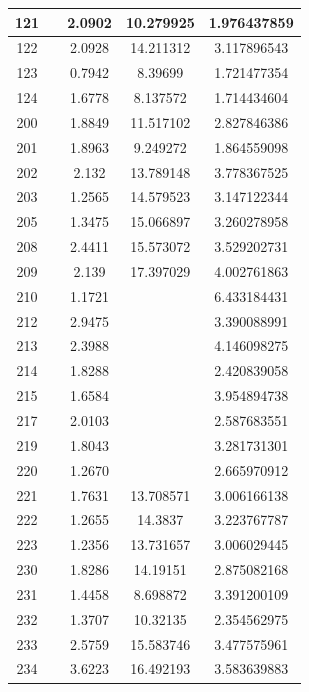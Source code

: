 \begin{table}[!tp]
\begin{tabular}{|c|c|c|c|c|}
		121 & & 2.0902 & 10.279925 & 1.976437859\\ \hline
		122 & & 2.0928 & 14.211312 & 3.117896543\\ \hline
		123 & & 0.7942 &  8.39699  & 1.721477354\\ \hline
		124 & & 1.6778 &  8.137572 & 1.714434604\\ \hline
		200 & & 1.8849 & 11.517102 & 2.827846386\\ \hline
		201 & & 1.8963 &  9.249272 & 1.864559098\\ \hline
		202 & & 2.132  & 13.789148 & 3.778367525\\ \hline
		203 & & 1.2565 & 14.579523 & 3.147122344\\ \hline
		205 & & 1.3475 & 15.066897 & 3.260278958\\ \hline
		208 & & 2.4411 & 15.573072 & 3.529202731\\ \hline
		209 & & 2.139  & 17.397029 & 4.002761863\\ \hline	
		210 & & 1.1721 &  & 6.433184431\\ \hline
		212 & & 2.9475 &  & 3.390088991\\ \hline
		213 & & 2.3988 &  & 4.146098275\\ \hline
		214 & & 1.8288 &  & 2.420839058\\ \hline
		215 & & 1.6584 &  & 3.954894738\\ \hline
		217 & & 2.0103 &  & 2.587683551\\ \hline
		219 & & 1.8043 &  & 3.281731301\\ \hline
		220 & & 1.2670 &  & 2.665970912\\ \hline		
		221 & & 1.7631 & 13.708571 & 3.006166138\\ \hline
		222 & & 1.2655 & 14.3837   & 3.223767787\\ \hline
		223 & & 1.2356 & 13.731657 & 3.006029445\\ \hline
		230 & & 1.8286 & 14.19151  & 2.875082168\\ \hline
		231 & & 1.4458 &  8.698872 & 3.391200109\\ \hline
		232 & & 1.3707 & 10.32135  & 2.354562975\\ \hline
		233 & & 2.5759 & 15.583746 & 3.477575961\\ \hline
		234 & & 3.6223 & 16.492193 & 3.583639883\\ \hline
	\end{tabular}
\end{table}

